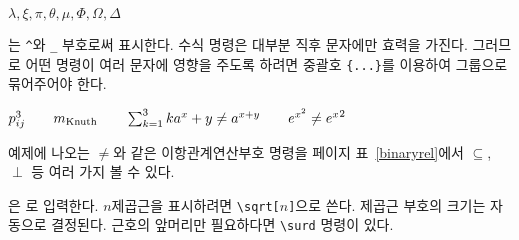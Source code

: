 \begin{example}
$\lambda,\xi,\pi,\theta,
 \mu,\Phi,\Omega,\Delta$
\end{example}

%
는 \verb|^|와 \verb|_| 부호로써 표시한다.
수식 명령은 대부분 직후 문자에만 효력을 가진다. 그러므로 어떤 명령이 여러 문자에 영향을 주도록 하려면 
중괄호 \verb|{...}|를 이용하여 그룹으로 묶어주어야 한다.


\begin{example}
$p^3_{ij} \qquad 
 m_\text{Knuth}\qquad
\sum_{k=1}^3 k \\[5pt]
 a^x+y \neq a^{x+y}\qquad 
 e^{x^2} \neq {e^x}^2$
\end{example}
\noindent 예제에 나오는 $\neq$와 같은 이항관계연산부호 명령을 
\pageref{binaryrel}페이지 표~\ref{binaryrel}에서 $\subseteq$, $\perp$ 등 여러 가지 볼 수 있다.


은 로 입력한다.
$n$제곱근을 표시하려면 \verb|\sqrt[|$n$\verb|]|으로 쓴다. 제곱근 부호의 크기는 자동으로 결정된다.
근호의 앞머리만 필요하다면 \verb|\surd| 명령이 있다.

